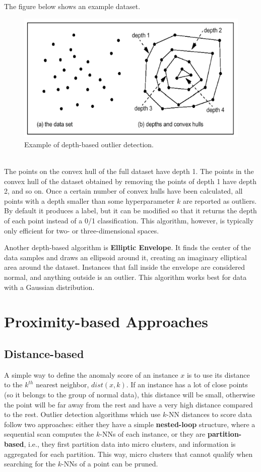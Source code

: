 The figure below shows an example dataset.
\begin{figure}[ht]
    \centering
    \includegraphics[width=0.5\linewidth]{img/depth_based_od.png}
    \caption{Example of depth-based outlier detection.}
    \label{fig:depth-od}
\end{figure} \\
The points on the convex hull of the full dataset have depth 1. The points in the convex hull of the dataset obtained by removing the points of depth 1 have depth 2, and so on. Once a certain number of convex hulls have been calculated, all points with a depth smaller than some hyperparameter $k$ are reported as outliers. By default it produces a label, but it can be modified so that it returns the depth of each point instead of a 0/1 classification. This algorithm, however, is typically only efficient for two- or three-dimensional spaces. 

Another depth-based algorithm is \textbf{Elliptic Envelope}. It finds the center of the data samples and draws an ellipsoid around it, creating an imaginary elliptical area around the dataset. Instances that fall inside the envelope are considered normal, and anything outside is an outlier. This algorithm works best for data with a Gaussian distribution.

\section{Proximity-based Approaches}

\subsection{Distance-based}

A simple way to define the anomaly score of an instance $x$ is to use its distance to the $k^{th}$ nearest neighbor, $\textit{dist}(x,k)$. If an instance has a lot of close points (so it belongs to the group of normal data), this distance will be small, otherwise the point will be far away from the rest and have a very high distance compared to the rest. Outlier detection algorithms which use $k$-NN distances to score data follow two approaches: either they have a simple \textbf{nested-loop} structure, where a sequential scan computes the $k$-NNs of each instance, or they are \textbf{partition-based}, i.e., they first partition data into micro clusters, and information is aggregated for each partition. This way, micro clusters that cannot qualify when searching for the $k$-NNs of a point can be pruned.


